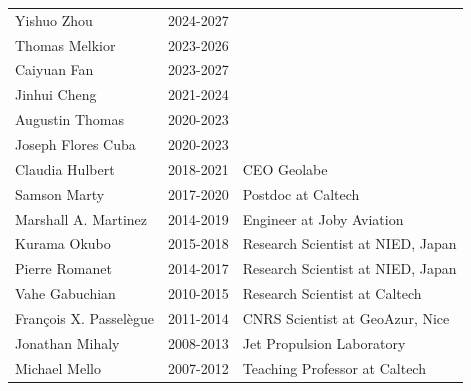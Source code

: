 \documentclass[10pt]{article}
\begin{document}
\begin{table}[h!]
\begin{tabular}{L{3.75cm}L{2cm}D{7cm}}
\color{groy}Yishuo Zhou           & 2024-2027&   \\
\color{groy}Thomas Melkior        & 2023-2026&   \\
\color{groy}Caiyuan Fan           & 2023-2027&   \\
\color{groy}Jinhui Cheng          & 2021-2024&   \\
\color{groy}Augustin Thomas       & 2020-2023&   \\
\color{groy}Joseph Flores Cuba    & 2020-2023&   \\
\color{gray}Claudia Hulbert    	  & 2018-2021&  CEO Geolabe\\
\color{gray}Samson Marty    	      & 2017-2020&  Postdoc at Caltech\\
\color{gray}Marshall A. Martinez  & 2014-2019&  Engineer at Joby Aviation \\
\color{gray}Kurama Okubo    	      & 2015-2018&  Research Scientist at NIED, Japan\\
\color{gray}Pierre Romanet        & 2014-2017&  Research Scientist at NIED, Japan\\
\color{gray}Vahe Gabuchian        & 2010-2015&  Research Scientist at Caltech\\
\color{gray}François X. Passelègue& 2011-2014&  CNRS Scientist at GeoAzur, Nice\\
\color{gray}Jonathan Mihaly       & 2008-2013&  Jet Propulsion Laboratory\\
\color{gray}Michael Mello         & 2007-2012&  Teaching Professor at Caltech\\[16pt]
\end{tabular}



\end{table}
\end{document}
